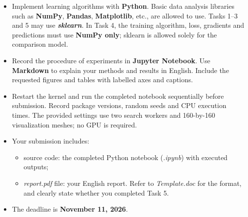 \documentclass[12pt,a4paper]{article}
\begin{document}
\begin{itemize}
  \item Implement learning algorithms with \textbf{Python}. Basic data analysis
        libraries such as \textbf{NumPy}, \textbf{Pandas}, \textbf{Matplotlib},
        etc., are allowed to use. Tasks 1--3 and 5 may use
        \textbf{\textit{sklearn}}. In Task 4, the training algorithm, loss,
        gradients and predictions must use \textbf{NumPy only}; sklearn is
        allowed solely for the comparison model.

  \item Record the procedure of experiments in \textbf{Jupyter Notebook}.
        Use \textbf{Markdown} to explain your methods and results in English.
        Include the requested figures and tables with labelled axes and captions.

  \item Restart the kernel and run the completed notebook sequentially before
        submission. Record package versions, random seeds and CPU execution
        times. The provided settings use two search workers and 160-by-160
        visualization meshes; no GPU is required.

  \item Your submission includes:
        \begin{itemize}
          \item source code: the completed Python notebook (\textit{.ipynb})
                with executed outputs;
          \item \textit{report.pdf} file: your English report. Refer to
                \textit{Template.doc} for the format, and clearly state whether
                you completed Task 5.
        \end{itemize}

  \item The deadline is \textbf{November 11, 2026}.
\end{itemize}
\end{document}

